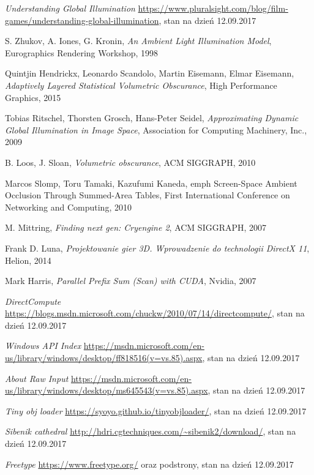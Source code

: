 \begin{thebibliography}{999}

 \emph{Understanding Global Illumination} \url{ https://www.pluralsight.com/blog/film-games/understanding-global-illumination}, stan na dzień 12.09.2017

 S. Zhukov, A. Iones, G. Kronin, \emph{An Ambient Light Illumination Model}, Eurographics Rendering Workshop, 1998

 Quintjin Hendrickx, Leonardo Scandolo, Martin Eisemann, Elmar Eisemann, \emph{Adaptively Layered Statistical Volumetric Obscurance}, High Performance Graphics, 2015

 Tobias Ritschel, Thorsten Grosch, Hans-Peter Seidel, \emph{Approximating Dynamic Global Illumination in Image Space}, Association for Computing Machinery, Inc., 2009

 B. Loos, J. Sloan, \emph{Volumetric obscurance}, ACM SIGGRAPH, 2010

 Marcos Slomp, Toru Tamaki, Kazufumi Kaneda, emph {Screen-Space Ambient Occlusion Through Summed-Area Tables}, First International Conference on Networking and Computing, 2010

 M. Mittring, \emph{Finding next gen: Cryengine 2}, ACM SIGGRAPH, 2007

 Frank D. Luna, \emph{Projektowanie gier 3D. Wprowadzenie do technologii DirectX 11}, Helion, 2014

 Mark Harris, \emph{Parallel Prefix Sum (Scan) with CUDA}, Nvidia, 2007

 \emph{DirectCompute} \url{https://blogs.msdn.microsoft.com/chuckw/2010/07/14/directcompute/}, stan na dzień 12.09.2017

 \emph{Windows API Index} \url{https://msdn.microsoft.com/en-us/library/windows/desktop/ff818516(v=vs.85).aspx}, stan na dzień 12.09.2017

 \emph{About Raw Input} \url{https://msdn.microsoft.com/en-us/library/windows/desktop/ms645543(v=vs.85).aspx}, stan na dzień 12.09.2017

 \emph{Tiny obj loader} \url{https://syoyo.github.io/tinyobjloader/}, stan na dzień 12.09.2017

 \emph{Sibenik cathedral} \url{http://hdri.cgtechniques.com/~sibenik2/download/}, stan na dzień 12.09.2017

 \emph{Freetype} \url{https://www.freetype.org/} oraz podstrony, stan na dzień 12.09.2017


\end{thebibliography}
